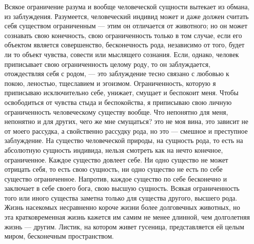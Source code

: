 \documentclass[12pt,oneside]{book}
\begin{document}
Всякое ограничение разума и вообще человеческой сущности вытекает из обмана, из заблуждения. Разумеется, человеческий индивид может и даже должен считать себя существом ограниченным --- этим он отличается от животного; но он может сознавать свою конечность, свою ограниченность только в том случае, если его объектом является совершенство, бесконечность рода, независимо от того, будет ли то объект чувства, совести или мыслящего сознания. Если, однако, человек приписывает свою ограниченность целому роду, то он заблуждается, отождествляя себя с родом, --- это заблуждение тесно связано с любовью к покою, леностью, тщеславием и эгоизмом. Ограниченность, которую я приписываю исключительно себе, унижает, смущает и беспокоит меня. Чтобы освободиться от чувства стыда и беспокойства, я приписываю свою личную ограниченность человеческому существу вообще. Что непонятно для меня, непонятно и для других, чего же мне смущаться? это не моя вина, это зависит не от моего рассудка, а свойственно рассудку рода, но это --- смешное и преступное заблуждение. На существо человеческой природы, на сущность рода, то есть на абсолютную сущность индивида, нельзя смотреть как на нечто конечное, ограниченное. Каждое существо довлеет себе. Ни одно существо не может отрицать себя, то есть свою сущность, ни одно существо не есть по себе существо ограниченное. Напротив, каждое существо по себе бесконечно и заключает в себе своего бога, свою высшую сущность. Всякая ограниченность того или иного существа заметна только для существа другого, высшего рода. Жизнь насекомых несравненно короче жизни более долговечных животных, но эта кратковременная жизнь кажется им самим не менее длинной, чем долголетняя жизнь --- другим. Листик, на котором живет гусеница, представляется ей целым миром, бесконечным пространством.
\end{document}
